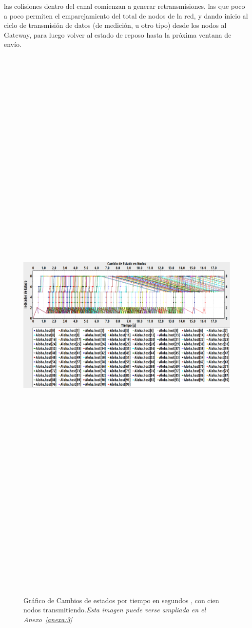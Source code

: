 \begin{justify}
 las colisiones dentro del canal comienzan a generar retransmisiones, las que poco a poco permiten el emparejamiento del total de nodos de la red, y dando inicio al ciclo de transmisión de datos (de medición, u otro tipo) desde los nodos al Gateway, para luego volver al estado de reposo hasta la próxima ventana de envío.\\
\begin{figure}[!ht]
\centering
\includegraphics[width=13cm,height=30cm,keepaspectratio]{images/cambioestado100nodos.eps}
\caption{Gráfico de Cambios de estados por tiempo en segundos , con cien nodos transmitiendo.\textit{Esta imagen puede verse ampliada en el Anexo~\ref{anexa:3}}}
\label{prueba:3}
\end{figure}

\end{justify}
